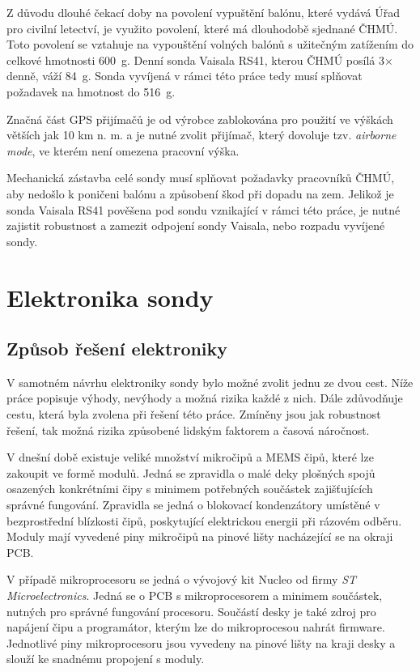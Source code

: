 \documentclass[twoside]{ctuthesis}
\theoremstyle{plain}
\theoremstyle{definition}
\theoremstyle{note}
\begin{document}
	Z důvodu dlouhé čekací doby na povolení vypuštění balónu, které vydává Úřad pro civilní letectví, je využito povolení, které má dlouhodobě sjednané ČHMÚ. Toto povolení se vztahuje na vypouštění volných balónů s užitečným zatížením do celkové hmotnosti 600~g. Denní sonda Vaisala RS41, kterou ČHMÚ posílá 3$\times$ denně, váží 84~g. Sonda vyvíjená v rámci této práce tedy musí splňovat požadavek na hmotnost do 516~g.

	Značná část GPS přijímačů je od výrobce zablokována pro použití ve výškách větších jak 10 km n. m. a je nutné zvolit přijímač, který dovoluje tzv. \textit{airborne mode}, ve kterém není omezena pracovní výška.

	Mechanická zástavba celé sondy musí splňovat požadavky pracovníků ČHMÚ, aby nedošlo k poničeni balónu a způsobení škod při dopadu na zem. Jelikož je sonda Vaisala RS41 pověšena pod sondu vznikající v rámci této práce, je nutné zajistit robustnost a zamezit odpojení sondy Vaisala, nebo rozpadu vyvíjené sondy.


	
	\section{Elektronika sondy}
	
	
		\subsection{Způsob řešení elektroniky}
		V samotném návrhu elektroniky sondy bylo možné zvolit jednu ze dvou cest. Níže práce popisuje výhody, nevýhody a možná rizika každé z nich. Dále zdůvodňuje cestu, která byla zvolena při řešení této práce. Zmíněny jsou jak robustnost řešení, tak možná rizika způsobené lidským faktorem a časová náročnost.

		V dnešní době existuje veliké množství mikročipů a MEMS čipů, které lze zakoupit ve formě modulů. Jedná se zpravidla o malé deky plošných spojů osazených konkrétními čipy s minimem potřebných součástek zajišťujících správné fungování. Zpravidla se jedná o blokovací kondenzátory umístěné v bezprostřední blízkosti čipů, poskytující elektrickou energii při rázovém odběru. Moduly mají vyvedené piny mikročipů na pinové lišty nacházející se na okraji PCB. 
		
		V případě mikroprocesoru se jedná o vývojový kit Nucleo od firmy \textit{ST Microelectronics}. Jedná se o PCB s mikroprocesorem a minimem součástek, nutných pro správné fungování procesoru. Součástí desky je také zdroj pro napájení čipu a programátor, kterým lze do mikroprocesou nahrát firmware. Jednotlivé piny mikroprocesoru jsou vyvedeny na pinové lišty na kraji desky a slouží ke snadnému propojení s moduly. 
		
\end{document}
